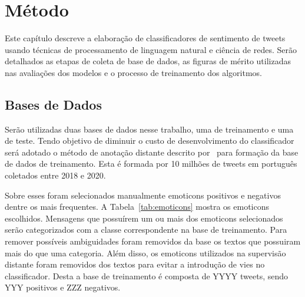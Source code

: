 \chapter{Método}
\label{chapter:method}

Este capítulo descreve a elaboração de classificadores de sentimento de tweets
usando técnicas de processamento de linguagem natural e ciência de redes.
Serão detalhados as etapas de coleta de base de dados, as figuras de mérito
utilizadas nas avaliações dos modelos e o processo de treinamento dos
algoritmos.

\section{Bases de Dados}

Serão utilizadas duas bases de dados nesse trabalho, uma de treinamento e uma de
teste.
Tendo objetivo de diminuir o custo de desenvolvimento do classificador será
adotado o método de anotação distante descrito por~\citet{go09} para formação da
base de dados de treinamento.
Esta é formada por 10 milhões de tweets em português coletados entre 2018 e 2020.

Sobre esses foram selecionados manualmente emoticons positivos e negativos
dentre os mais frequentes. A Tabela~\ref{tab:emoticons} mostra os emoticons
escolhidos.
Mensagens que possuírem um ou mais dos emoticons selecionados serão
categorizados com a classe correspondente na base de treinamento.
Para remover possíveis ambiguidades foram removidos da base os textos que
possuiram mais do que uma categoria.
Além disso, os emoticons utilizados na supervisão distante foram removidos dos
textos para evitar a introdução de vies no classificador.
Desta a base de treinamento é composta de YYYY tweets, sendo YYY positivos e ZZZ
negativos.

